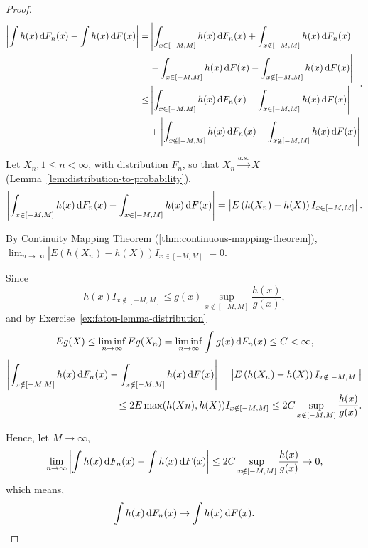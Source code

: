\begin{proof}
	\begin{equation*}
		\begin{aligned}
			\left|\int h(x)\dif F_{n}(x)-\int h(x)\dif F(x)\right| = & \left|{\int_{x\in[-M,M]}h(x)\dif F_{n}(x)+\int_{x\notin[-M,M]}h(x)\dif F_{n}(x)}\right. \\
			                                                         & \left.{-\int_{x\in[-M,M]}h(x)\dif F(x)-\int_{x\notin[-M,M]}h(x)\dif F(x)}\right|        \\
			\leq                                                     & \left|\int_{x\in[-M,M]}h(x)\dif F_{n}(x)-\int_{x\in[-M,M]}h(x)\dif F(x)\right|          \\
			                                                         & + \left|\int_{x\notin[-M,M]}h(x)\dif F_{n}(x)-\int_{x\notin[-M,M]}h(x)\dif F(x)\right|
		\end{aligned}.
	\end{equation*}

	Let \(X_n,1\leq n<\infty\), with distribution \(F_n\), so that \(X_n\stackrel{a.s.}{\rightarrow}X\) (Lemma~\ref{lem:distribution-to-probability}).
	\begin{equation*}
		\left|\int_{x\in[-M,M]}h(x)\mathop{}\!\mathrm{d} F_{n}(x)-\int_{x\in[-M,M]}h(x)\mathop{}\!\mathrm{d} F(x)\right| = \left|E\left(h(X_n)-h(X)\right)I_{x\in[-M,M]}\right|.
	\end{equation*}

	By Continuity Mapping Theorem (\ref{thm:continuous-mapping-theorem}), \(\lim_{n\rightarrow\infty}\left|E\left(h(X_n)-h(X)\right)I_{x\in[-M,M]}\right| = 0\).

	Since
	\begin{equation*}
		h(x)I_{x\notin[-M,M]}\leq g(x)\sup_{x\notin[-M,M]}\frac{h(x)}{g(x)},
	\end{equation*}
	and by Exercise~\ref{ex:fatou-lemma-distribution}
	\begin{equation*}
		Eg(X) \leq \liminf_{n\rightarrow\infty}Eg(X_n)=\liminf_{n\rightarrow\infty}\int g(x)\mathop{}\!\mathrm{d} F_{n}(x)\leq C<\infty,
	\end{equation*}
	\begin{equation*}
		\begin{aligned}
			\left|\int_{x\notin[-M,M]}h(x)\mathop{}\!\mathrm{d} F_{n}(x)-\int_{x\notin[-M,M]}h(x)\mathop{}\!\mathrm{d} F(x)\right| = \left|E\left(h(X_n)-h(X)\right)I_{x\notin[-M,M]}\right| \\
			\leq 2E\max(h(Xn),h(X))I_{x\notin[-M,M]}\leq 2C\sup_{x\notin[-M,M]}\frac{h(x)}{g(x)}.                                                          \\
		\end{aligned}
	\end{equation*}

	Hence, let \(M\rightarrow\infty\),
	\begin{equation*}
		\lim_{n\rightarrow\infty}\left|\int h(x)\mathop{}\!\mathrm{d} F_{n}(x)-\int h(x)\mathop{}\!\mathrm{d} F(x)\right| \leq 2C\sup_{x\notin[-M,M]}\frac{h(x)}{g(x)}\rightarrow 0,
	\end{equation*}
	which means,
	\begin{equation*}
		\int h(x)\mathop{}\!\mathrm{d} F_{n}(x) \rightarrow \int h(x)\mathop{}\!\mathrm{d} F(x).
	\end{equation*}
\end{proof}

